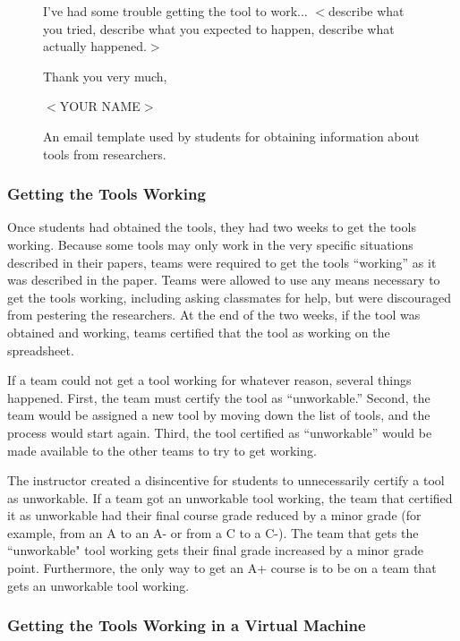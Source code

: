 \documentclass[10pt,conference]{IEEEtran}
\begin{document}
\begin{figure}[t]
{\begin{minipage}{\dimexpr\linewidth-2\fboxrule-2\fboxsep}
\vspace{1mm}\noindent
I've had some trouble getting the tool to work... $<$describe what you tried, describe what you 
expected to happen, describe what actually happened.$>$

\vspace{2mm}\noindent
Thank you very much,

\vspace{1mm}\noindent
$<$YOUR NAME$>$
\end{minipage}}

\caption{An email template used by students for obtaining information about tools from researchers.}\label{fig:email}

\end{figure}

\subsubsection{Getting the Tools Working}

Once students had obtained the tools, they had two weeks to get 
the tools working.
Because some tools may only work in the very specific situations 
described in their papers,
teams were required to get the tools ``working'' as it was described
in the paper.
Teams were allowed to use any means necessary to get the tools working,
including asking classmates for help, but were discouraged from
pestering the researchers.
At the end of the two weeks, if the tool was obtained and working,
teams certified that the tool as working on the spreadsheet.

If a team could not get a tool working for whatever reason, 
several things happened.
First, the team must certify the tool as ``unworkable.''
Second, the team would be assigned a new tool by moving down the list
of tools, and the process would start again.
Third, the tool certified as ``unworkable'' would be made available 
to the other teams to try to get working.

The instructor created a disincentive for students to unnecessarily 
certify a tool as unworkable.
If a team got an unworkable tool working, the team that certified it as  
unworkable had their final course grade reduced by a minor 
grade (for example, from an A to an A- or from a C to a C-).
The team that gets the ``unworkable" tool working gets their final grade increased
by a minor grade point.
Furthermore, the only way to get an A+ course is to be on a team
that gets an unworkable tool working.

\subsubsection{Getting the Tools Working in a Virtual Machine}
\end{document}

